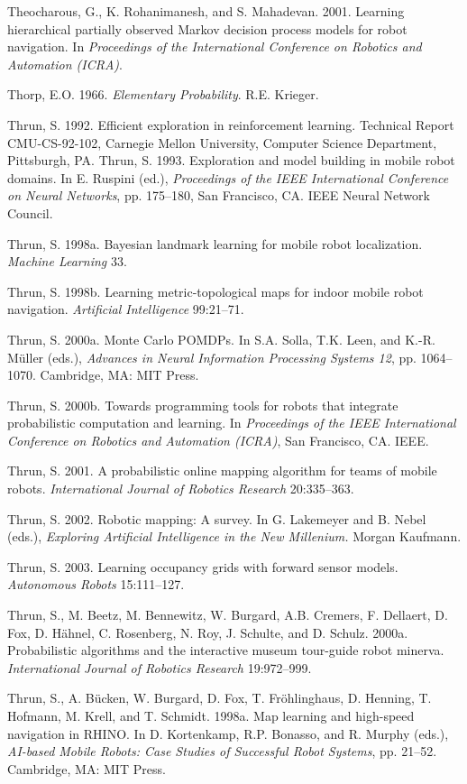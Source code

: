 \documentclass[10pt,a4paper]{article}
\begin{document}
Theocharous, G., K. Rohanimanesh, and S. Mahadevan. 2001. Learning hierarchical
partially observed Markov decision process models for robot navigation. In
\textit{Proceedings of the International Conference on Robotics and Automation (ICRA)}.

Thorp, E.O. 1966. \textit{Elementary Probability}. R.E. Krieger.

Thrun, S. 1992. Efficient exploration in reinforcement learning. Technical Report
CMU-CS-92-102, Carnegie Mellon University, Computer Science Department,
Pittsburgh, PA.
Thrun, S. 1993. Exploration and model building in mobile robot domains. In E. Ruspini
(ed.), \textit{Proceedings of the IEEE International Conference on Neural Networks}, pp.
175–180, San Francisco, CA. IEEE Neural Network Council.

Thrun, S. 1998a. Bayesian landmark learning for mobile robot localization. \textit{Machine
Learning }33.

Thrun, S. 1998b. Learning metric-topological maps for indoor mobile robot navigation.
\textit{Artificial Intelligence} 99:21–71.

Thrun, S. 2000a. Monte Carlo POMDPs. In S.A. Solla, T.K. Leen, and K.-R. Müller
(eds.), \textit{Advances in Neural Information Processing Systems 12}, pp. 1064–1070. Cambridge,
MA: MIT Press.

Thrun, S. 2000b. Towards programming tools for robots that integrate probabilistic
computation and learning. In \textit{Proceedings of the IEEE International Conference on
Robotics and Automation (ICRA)}, San Francisco, CA. IEEE.

Thrun, S. 2001. A probabilistic online mapping algorithm for teams of mobile robots.
\textit{International Journal of Robotics Research} 20:335–363.

Thrun, S. 2002. Robotic mapping: A survey. In G. Lakemeyer and B. Nebel (eds.),
\textit{Exploring Artificial Intelligence in the New Millenium.} Morgan Kaufmann.

Thrun, S. 2003. Learning occupancy grids with forward sensor models. \textit{Autonomous
Robots }15:111–127.

Thrun, S., M. Beetz, M. Bennewitz, W. Burgard, A.B. Cremers, F. Dellaert, D. Fox,
D. Hähnel, C. Rosenberg, N. Roy, J. Schulte, and D. Schulz. 2000a. Probabilistic
algorithms and the interactive museum tour-guide robot minerva. \textit{International
Journal of Robotics Research} 19:972–999.

Thrun, S., A. Bücken, W. Burgard, D. Fox, T. Fröhlinghaus, D. Henning, T. Hofmann,
M. Krell, and T. Schmidt. 1998a. Map learning and high-speed navigation in
RHINO. In D. Kortenkamp, R.P. Bonasso, and R. Murphy (eds.), \textit{AI-based Mobile
Robots: Case Studies of Successful Robot Systems}, pp. 21–52. Cambridge, MA: MIT
Press.
\end{document}

